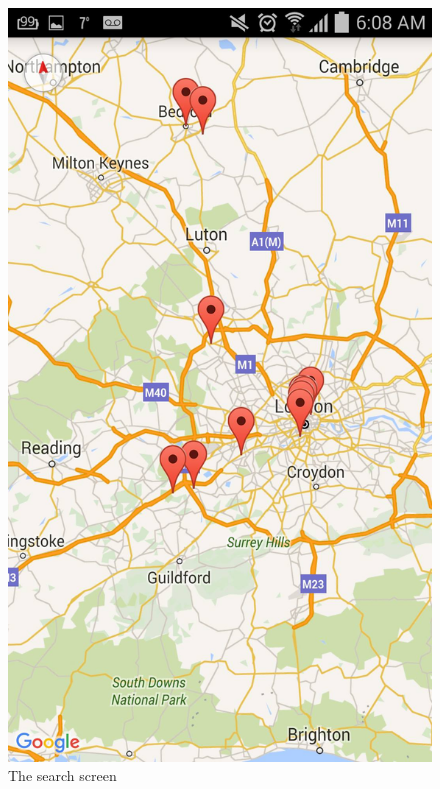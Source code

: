 \documentclass[11pt,a4paper]{article}
\begin{document}
\begin{figure}[H]
\centering
\includegraphics[scale=.08]{screen3.jpg}
\caption{The search screen}
\end{figure}
\end{document}
